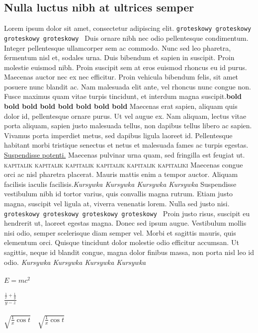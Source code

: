 \documentclass[12pt,a4paper]{article}
\begin{document}
\subsection{Nulla luctus nibh at ultrices semper}
Lorem ipsum dolor sit amet, consectetur adipiscing elit. \texttt{groteskowy groteskowy groteskowy groteskowy } Duis ornare nibh nec odio pellentesque condimentum. Integer pellentesque ullamcorper sem ac commodo. Nunc sed leo pharetra, fermentum nisl et, sodales urna. Duis bibendum et sapien in suscipit. Proin molestie euismod nibh. Proin suscipit sem at eros euismod rhoncus eu id purus. Maecenas auctor nec ex nec efficitur. Proin vehicula bibendum felis, sit amet posuere nunc blandit ac. Nam malesuada elit ante, vel rhoncus nunc congue non. Fusce maximus quam vitae turpis tincidunt, et interdum magna suscipit.\textbf{bold bold bold bold bold bold bold bold} Maecenas erat sapien, aliquam quis dolor id, pellentesque ornare purus. Ut vel augue ex. Nam aliquam, lectus vitae porta aliquam, sapien justo malesuada tellus, non dapibus tellus libero ac sapien. Vivamus porta imperdiet metus, sed dapibus ligula laoreet id. Pellentesque habitant morbi tristique senectus et netus et malesuada fames ac turpis egestas. \underline{Suspendisse potenti.} Maecenas pulvinar urna quam, sed fringilla est feugiat ut.  \textsc{kapitalik kapitalik kapitalik kapitalik kapitalik kapitaliki} Maecenas congue orci ac nisl pharetra placerat. Mauris mattis enim a tempor auctor. Aliquam facilisis iaculis facilisis.\textit{Kursywka Kursywka Kursywka Kursywka} Suspendisse vestibulum nibh id tortor varius, quis convallis magna rutrum. Etiam justo magna, suscipit vel ligula at, viverra venenatis lorem. Nulla sed justo nisi. \texttt{groteskowy groteskowy groteskowy groteskowy } Proin justo risus, suscipit eu hendrerit ut, laoreet egestas magna. Donec sed ipsum augue. Vestibulum mollis nisi odio, semper scelerisque diam semper vel. Morbi et sagittis mauris, quis elementum orci. Quisque tincidunt dolor molestie odio efficitur accumsan. Ut sagittis, neque id blandit congue, magna dolor finibus massa, non porta nisl leo id odio. \textit{Kursywka Kursywka Kursywka Kursywka}\\\\
$E = mc^2$ \\\\
$\frac{\frac{1}{x}+\frac{1}{y}}{y-z}$\\\\
$\sqrt{\tfrac{1}{x}\cos t}\quad \sqrt{\frac{1}{x}\cos t}$
\end{document}
